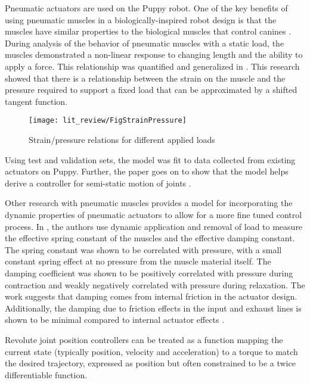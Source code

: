 Pneumatic actuators are used on the Puppy robot. One of the key
benefits of using pneumatic muscles in a biologically-inspired robot design is
that the muscles have similar properties to the biological muscles that control
canines \cite{Tavakoli2008}.
During analysis of the behavior of pneumatic muscles with a static load, the muscles demonstrated a non-linear response to
changing length and the ability to apply a force. This relationship was
quantified and generalized in \cite{HuntPMuscles}. This research showed that
there is a relationship between the strain on the muscle and the pressure
required to support a fixed load that can be approximated by a shifted tangent
function. 

\begin{figure}[h!]
\centering
\texttt{[image: lit\_review/FigStrainPressure]}
\caption{Strain/pressure relations for different applied loads}
\label{fig:StrainPressure}
\end{figure}

Using test and validation sets, the model was fit to data collected
from existing actuators on Puppy. Further, the paper goes on to show that the
model helps derive a controller for semi-static motion of joints \cite{HuntPMuscles}.

Other research with pneumatic muscles provides a model for incorporating the
dynamic properties of pneumatic actuators to allow for a more fine tuned control
process. In \cite{DynamicPMuscles}, the authors use dynamic application and
removal of load to measure the effective spring constant of the muscles and the
effective damping constant. The spring constant was shown to be correlated with
pressure, with a small constant spring effect at no pressure from the muscle
material itself. The damping coefficient was shown to be positively correlated
with pressure during contraction and weakly negatively correlated with pressure
during relaxation. The work suggests that damping comes from internal
friction in the actuator design. Additionally, the damping due to friction
effects in the input and exhaust lines is shown to be minimal compared to
internal actuator effects \cite{DynamicPMuscles}.



Revolute joint position controllers can be treated as a function mapping the current
state (typically position, velocity and acceleration) to a torque to match the 
desired trajectory, expressed as position but often constrained to be a twice
differentiable function.

